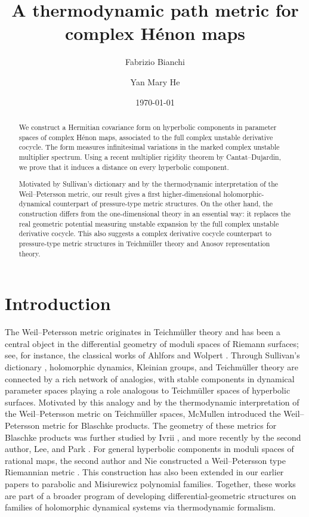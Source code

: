 \documentclass[11pt]{amsart}
\title{A thermodynamic path metric for complex H\'enon maps}
\author{Fabrizio Bianchi}
\author{Yan Mary He}
\date{\today}
\theoremstyle{plain}
\theoremstyle{definition}
\theoremstyle{remark}
\begin{document}
\begin{abstract}
We construct a Hermitian covariance form on hyperbolic components
in parameter spaces
of complex H\'enon maps, associated to the full complex unstable derivative cocycle.
The form measures infinitesimal variations in the marked complex unstable multiplier spectrum. 
Using a recent multiplier rigidity theorem by Cantat--Dujardin, we prove that it induces a distance on every hyperbolic component.

Motivated by Sullivan's dictionary and by the thermodynamic interpretation of the Weil--Petersson metric, our result gives a first higher-dimensional holomorphic-dynamical counterpart of pressure-type metric structures.
On the other hand, the construction differs from the 
one-dimensional theory
in an essential way: it replaces the real geometric potential measuring unstable expansion by the full complex unstable derivative cocycle. 
This also 
suggests a complex derivative cocycle counterpart to pressure-type metric structures in Teichm\"uller theory and Anosov representation theory.
\end{abstract}


\maketitle
\section{Introduction}
The Weil--Petersson metric originates in Teichm\"uller theory and has been a central object in the differential geometry of moduli spaces of Riemann surfaces; see, for instance, the classical works of Ahlfors \cite{Ahlfors61} and Wolpert \cite{Wolpert86}.
Through Sullivan's dictionary \cite{Sullivan83,McMullen95}, holomorphic dynamics, Kleinian groups, and Teichm\"uller theory are connected by a rich network of analogies, with stable components in dynamical parameter spaces playing a role analogous to Teichm\"uller spaces of hyperbolic surfaces. 
Motivated by this analogy and by the thermodynamic interpretation of the Weil--Petersson metric on Teichm\"uller spaces, McMullen \cite{McMullen08} introduced the Weil--Petersson metric for Blaschke products.
The geometry of these metrics for Blaschke products was further studied by Ivrii \cite{Ivrii14}, and more recently by the second author, Lee, and Park \cite{HLP23,HLP25}. For general hyperbolic components in moduli spaces of rational maps, the second author and Nie constructed a Weil--Petersson type Riemannian metric \cite{HeNie23}. This construction has also been extended in our earlier papers \cite{BH24,BH25} to parabolic and Misiurewicz polynomial families. Together, these works are part of a broader program of developing differential-geometric structures on families of holomorphic dynamical systems via thermodynamic formalism.
\end{document}
